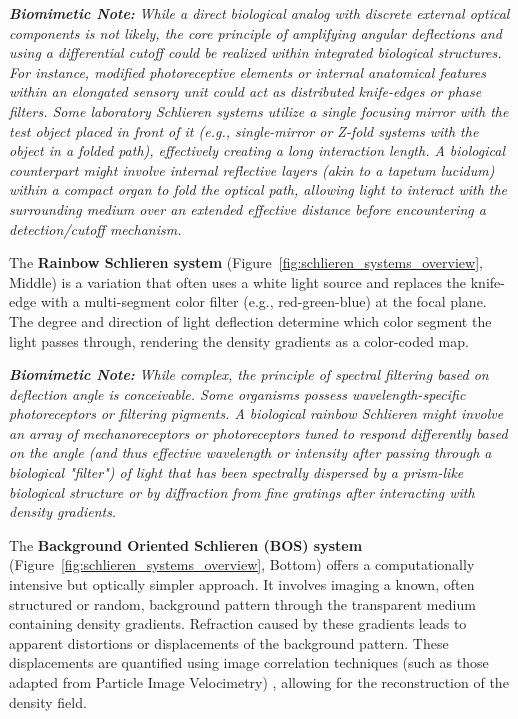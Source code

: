 \documentclass[11pt]{article}
\begin{document}
     \textbf{\textit{Biomimetic Note:}}\textit{ While a direct biological analog with discrete external optical components is not likely, the core principle of amplifying angular deflections and using a differential cutoff could be realized within integrated biological structures. For instance, modified photoreceptive elements or internal anatomical features within an elongated sensory unit could act as distributed knife-edges or phase filters. Some laboratory Schlieren systems utilize a single focusing mirror with the test object placed in front of it (e.g., single-mirror or Z-fold systems with the object in a folded path), effectively creating a long interaction length. A biological counterpart might involve internal reflective layers (akin to a tapetum lucidum) within a compact organ to fold the optical path, allowing light to interact with the surrounding medium over an extended effective distance before encountering a detection/cutoff mechanism.}

The \textbf{Rainbow Schlieren system} (Figure~\ref{fig:schlieren_systems_overview}, Middle) \cite{Howes1984Rainbow, Settles2001Schlieren} is a variation that often uses a white light source and replaces the knife-edge with a multi-segment color filter (e.g., red-green-blue) at the focal plane. The degree and direction of light deflection determine which color segment the light passes through, rendering the density gradients as a color-coded map.

     \textbf{\textit{Biomimetic Note:}}\textit{ While complex, the principle of spectral filtering based on deflection angle is conceivable. Some organisms possess wavelength-specific photoreceptors or filtering pigments. A biological rainbow Schlieren might involve an array of mechanoreceptors or photoreceptors tuned to respond differently based on the angle (and thus effective wavelength or intensity after passing through a biological "filter") of light that has been spectrally dispersed by a prism-like biological structure or by diffraction from fine gratings after interacting with density gradients.}

The \textbf{Background Oriented Schlieren (BOS) system} (Figure~\ref{fig:schlieren_systems_overview}, Bottom) \cite{Raffel2018PIV} offers a computationally intensive but optically simpler approach. It involves imaging a known, often structured or random, background pattern through the transparent medium containing density gradients. Refraction caused by these gradients leads to apparent distortions or displacements of the background pattern. These displacements are quantified using image correlation techniques (such as those adapted from Particle Image Velocimetry) \cite{Raffel2018PIV}, allowing for the reconstruction of the density field.
\end{document}
